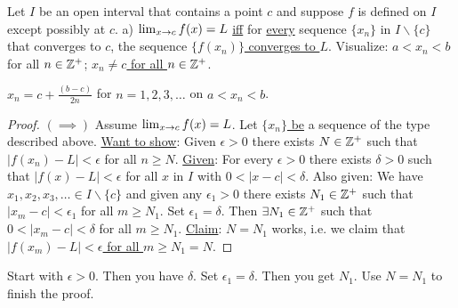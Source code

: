 \documentclass[]{article}
\begin{document}
\begin{theorem}
	Let $I$ be an open interval that contains a point $c$ and suppose $f$ is defined on $I$ except possibly at $c$.
	a) \ul{$\lim_{x\rightarrow c}f(x) = L$} \ul{iff} for \ul{every} sequence \ul{$\{x_n\}$} in \ul{$I \backslash \{c\}$} that converges to $c$, the sequence \ul{$\{f(x_n)\}$ converges to $L$}. Visualize: $a<x_n<b$ for all $n\in\mathbb{Z}^+$; \ul{$x_n\neq c$ for all $n\in\mathbb{Z}^+$}.
\end{theorem}
\begin{example}
	$x_n = c+\frac{(b-c)}{2n}$ for $n=1,2,3,\dots$ on $a<x_n<b$.
\end{example}
\begin{proof}
	$(\implies)$ Assume $\lim_{x\rightarrow c} f(x) = L$. Let \ul{$\{x_n\}$ be} a sequence of the type described above.
	\ul{Want to show}: Given $\epsilon>0$ there exists $N\in\mathbb{Z}^+$ such that $|f(x_n)-L|<\epsilon$ for all $n\geq N$.
	\ul{Given}: For every $\epsilon>0$ there exists $\delta>0$ such that $|f(x)-L|<\epsilon$ for all $x$ in $I$ with $0<|x-c|<\delta$.
	Also given: We have $x_1,x_2,x_3,\dots \in I\backslash \{c\}$ and given any $\epsilon_1>0$ there exists $N_1 \in \mathbb{Z}^+$ such that $|x_m-c|<\epsilon_1$ for all $m\geq N_1$.
	Set $\epsilon_1 = \delta$. Then $\exists N_1\in\mathbb{Z}^+$ such that \ul{$0<|x_m-c|<\delta$} for all $m\geq N_1$.
	\ul{Claim}: $N=N_1$ works, i.e. we claim that \ul{$|f(x_m)-L|<\epsilon$ for all $m\geq N_1=N$}.
\end{proof}
\begin{remark}
	 Start with $\epsilon>0$. Then you have $\delta$. Set $\epsilon_1 = \delta$. Then you get $N_1$. Use $N=N_1$ to finish the proof.
\end{remark}
\end{document}
